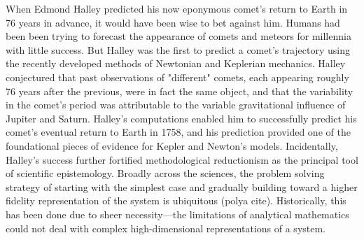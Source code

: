 \documentclass[]{article}
\begin{document}
When Edmond Halley predicted his now eponymous comet's return to Earth
in 76 years in advance, it would have been wise to bet against him.
Humans had been been trying to forecast the appearance of comets and
meteors for millennia with little success. But Halley was the first to
predict a comet's trajectory using the recently developed methods of
Newtonian and Keplerian mechanics. Halley conjectured that past
observations of "different" comets, each appearing roughly 76 years
after the previous, were in fact the same object, and that the
variability in the comet's period was attributable to the variable
gravitational influence of Jupiter and Saturn. Halley's computations
enabled him to successfully predict his comet's eventual return to Earth
in 1758, and his prediction provided one of the foundational pieces of
evidence for Kepler and Newton's models. Incidentally, Halley's success
further fortified methodological reductionism as the principal tool of
scientific epistemology. Broadly across the sciences, the problem
solving strategy of starting with the simplest case and gradually
building toward a higher fidelity representation of the system is
ubiquitous (polya cite). Historically, this has been done due to sheer
necessity---the limitations of analytical mathematics could not deal
with complex high-dimensional representations of a system.
\end{document}
